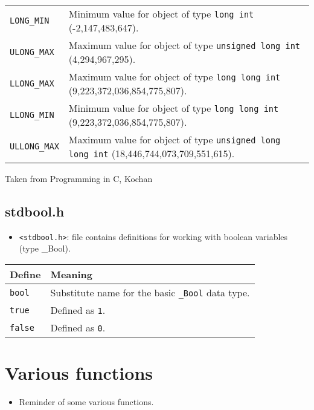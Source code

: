 \begin{center}
\begin{tabular}{ |p{6cm}|p{10cm}| }
            \texttt{LONG_MIN} & Minimum value for object of type \texttt{long int} (-2,147,483,647). \\ 
            \texttt{ULONG_MAX} & Maximum value for object of type \texttt{unsigned long int} (4,294,967,295). \\ 
            \texttt{LLONG_MAX} & Maximum value for object of type \texttt{long long int} (9,223,372,036,854,775,807). \\ 
            \texttt{LLONG_MIN} & Minimum value for object of type \texttt{long long int} (9,223,372,036,854,775,807). \\ 
            \texttt{ULLONG_MAX} & Maximum value for object of type \texttt{unsigned long long int} (18,446,744,073,709,551,615). \\ 
        \hline
    \end{tabular}
    Taken from Programming in C, Kochan
\end{center}

\subsection{stdbool.h}
\begin{itemize}
    \item \verb|<stdbool.h>|: file contains definitions for working with boolean variables (type \_Bool).
\end{itemize}
\begin{center}
    \begin{tabular}{ |p{6cm}|p{10cm}| }
        \hline
            Define & Meaning \\
        \hline
            \texttt{bool} & Substitute name for the basic \texttt{_Bool} data type. \\ 
            \texttt{true} & Defined as \texttt{1}. \\ 
            \texttt{false} & Defined as \texttt{0}. \\ 
        \hline
    \end{tabular}
\end{center}


\section{Various functions}
\begin{itemize}
    \item Reminder of some various functions.
\end{itemize}

